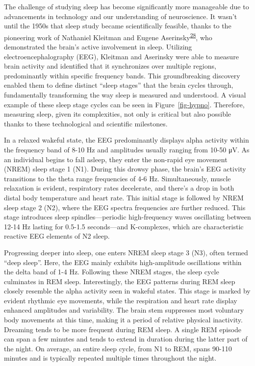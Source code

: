 \documentclass[
  9pt,
]{scrbook}
\begin{document}
The challenge of studying sleep has become significantly more manageable
due to advancements in technology and our understanding of neuroscience.
It wasn't until the 1950s that sleep study became scientifically
feasible, thanks to the pioneering work of Nathaniel Kleitman and Eugene
Aserinsky\textsuperscript{\protect\hyperlink{ref-aserinsky_1953}{28}},
who demonstrated the brain's active involvement in sleep. Utilizing
electroencephalography (EEG), Kleitman and Aserinsky were able to
measure brain activity and identified that it synchronizes over multiple
regions, predominantly within specific frequency bands. This
groundbreaking discovery enabled them to define distinct ``sleep
stages'' that the brain cycles through, fundamentally transforming the
way sleep is measured and understood. A visual example of these sleep
stage cycles can be seen in Figure~\ref{fig-hypno}. Therefore, measuring
sleep, given its complexities, not only is critical but also possible
thanks to these technological and scientific milestones.

In a relaxed wakeful state, the EEG predominantly displays alpha
activity within the frequency band of 8-10 Hz and amplitudes usually
ranging from 10-50 μV. As an individual begins to fall asleep, they
enter the non-rapid eye movement (NREM) sleep stage 1 (N1). During this
drowsy phase, the brain's EEG activity transitions to the theta range
frequencies of 4-6 Hz. Simultaneously, muscle relaxation is evident,
respiratory rates decelerate, and there's a drop in both distal body
temperature and heart rate. This initial stage is followed by NREM sleep
stage 2 (N2), where the EEG spectra frequencies are further reduced.
This stage introduces sleep spindles---periodic high-frequency waves
oscillating between 12-14 Hz lasting for 0.5-1.5 seconds---and
K-complexes, which are characteristic reactive EEG elements of N2 sleep.

Progressing deeper into sleep, one enters NREM sleep stage 3 (N3), often
termed ``deep sleep''. Here, the EEG mainly exhibits high-amplitude
oscillations within the delta band of 1-4 Hz. Following these NREM
stages, the sleep cycle culminates in REM sleep. Interestingly, the EEG
patterns during REM sleep closely resemble the alpha activity seen in
wakeful states. This stage is marked by evident rhythmic eye movements,
while the respiration and heart rate display enhanced amplitudes and
variability. The brain stem suppresses most voluntary body movements at
this time, making it a period of relative physical inactivity. Dreaming
tends to be more frequent during REM sleep. A single REM episode can
span a few minutes and tends to extend in duration during the latter
part of the night. On average, an entire sleep cycle, from N1 to REM,
spans 90-110 minutes and is typically repeated multiple times throughout
the night.
\end{document}
